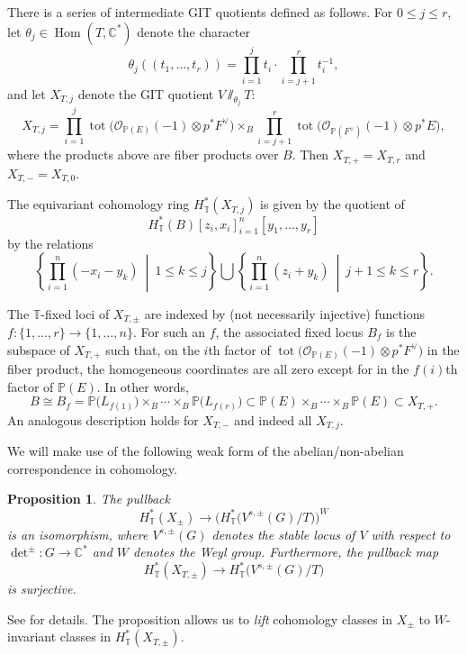 \documentclass[pdftex]{sigma}
\newtheorem{Proposition}[Theorem]{Proposition}
 { \theoremstyle{definition}
\newtheorem{Definition}[Theorem]{Definition}
\newtheorem{Note}[Theorem]{Note}
\newtheorem{Example}[Theorem]{Example}
\newtheorem{Remark}[Theorem]{Remark} }
\numberwithin{equation}{section}
\newcommand{\cc}[1]{\mathcal{#1}} %
\newcommand{\CC}{\mathbb{C}}
\newcommand{\PP}{\mathbb{P}}
\newcommand{\torus}{\mathbb{T}}
\DeclareMathOperator{\tot}{tot}
\DeclareMathOperator{\Hom}{Hom}
\newcommand{\F}{F}
\newcommand{\E}{E}
\newcommand{\LB}{L}
\newcommand{\z}{z}
\newcommand{\x}{x}
\newcommand{\y}{y}
\begin{document}
There is a series of intermediate GIT quotients defined as follows. For $0\leq j \leq r$, let $\theta_j \in \Hom(T, \CC^*)$ denote the character
\[
\theta_j ((t_1, \dots, t_r)) = \prod_{i=1}^{j} t_i \cdot \prod_{i=j+1}^r t_i^{-1},
\]
and let $X_{T, j}$ denote the GIT quotient $ V \sslash_{\theta_j} T$:
\[
X_{T, j} = \prod_{i=1}^{j} \tot \bigl( \cc O_{\PP(\E)}(-1) \otimes p^*\F^\vee\bigr) \times_B \prod_{i=j+1}^{r} \tot \bigl( \cc O_{\PP(\F^\vee)}(-1) \otimes p^*\E\bigr),
\]
where the products above are fiber products over $B$. Then $X_{T, {+}} = X_{T, r}$ and $X_{T, {-}} = X_{T, 0}$.

The equivariant cohomology ring $H^*_\torus(X_{T, j})$ is given by the quotient of
\[
H^*_\torus(B)[\z_i, \x_i]_{i=1}^n[\y_1, \dots, \y_r]
\]
by the relations
\begin{equation}\label{e:rels}
\left\{\prod_{i=1}^n (- \x_i - \y_k)\ \middle|\ 1 \leq k \leq j\right\} \bigcup \left\{\prod_{i=1}^n (\z_i + \y_k)\ \middle|\ j+1 \leq k \leq r\right\}.
\end{equation}

The $\torus$-fixed loci of $X_{T, \pm}$ are indexed by (not necessarily injective) functions $f\colon \{1, \dots, r\} \to \{1, \dots, n\}$. For such an $f$, the associated fixed locus $B_f$ is the subspace of $X_{T, +}$ such that, on the $i$th factor of
$\tot \bigl( \cc O_{\PP(\E)}(-1) \otimes p^*\F^\vee\bigr)$ in the fiber product, the homogeneous coordinates are all zero except for in the $f(i)$th factor of $\PP(\E)$.
In other words,
\[
B \cong B_f = \PP\bigl(\LB_{f(1)}\bigr) \times_B \cdots \times_B \PP\bigl(\LB_{f(r)}\bigr) \subset \PP(\E) \times_B \cdots \times_B \PP(\E) \subset X_{T, +}.
\]
An analogous description holds for $X_{T, -}$ and indeed all $X_{T, j}$.

We will make use of the following weak form of the abelian/non-abelian correspondence in cohomology.

\begin{Proposition}\label{p:pull}
The pullback
\[
H^*_\torus(X_\pm) \to \bigl(H^*_\torus\bigl( V^{s, \pm}(G)/T\bigr)\bigr)^W
\]
is an isomorphism, where $V^{s, \pm}(G)$ denotes the stable locus of $V$ with respect to $\det^{\pm}\colon G \to \CC^*$ and $W$ denotes the Weyl group. Furthermore, the pullback map
\[
H^*_\torus(X_{T, \pm}) \to H^*_\torus\bigl( V^{s, \pm}(G)/T\bigr)
\]
is surjective.
\end{Proposition}

See \cite[Proposition 1]{Brion} for details.
The proposition allows us to \emph{lift} cohomology classes in $X_{\pm}$ to $W$-invariant classes in $H^*_\torus(X_{T, \pm})$.
\end{document}
